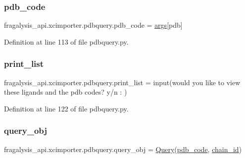 \subsubsection{\texorpdfstring{pdb\+\_\+code}{pdb\_code}}
{\footnotesize\ttfamily fragalysis\+\_\+api.\+xcimporter.\+pdbquery.\+pdb\+\_\+code = \hyperlink{namespacefragalysis__api_1_1xcimporter_1_1pdbquery_aa63ace70140ec79679f3f8be87bb2564}{args}\mbox{[}\textquotesingle{}pdb\textquotesingle{}\mbox{]}}



Definition at line 113 of file pdbquery.\+py.

\mbox{\label{namespacefragalysis__api_1_1xcimporter_1_1pdbquery_a86c375701bbb49fc0670930962e1d2ee}} 
\subsubsection{\texorpdfstring{print\+\_\+list}{print\_list}}
{\footnotesize\ttfamily fragalysis\+\_\+api.\+xcimporter.\+pdbquery.\+print\+\_\+list = input(\textquotesingle{}would you like to view these ligands and the pdb codes? y/n \+: \textquotesingle{})}



Definition at line 122 of file pdbquery.\+py.

\mbox{\label{namespacefragalysis__api_1_1xcimporter_1_1pdbquery_a71559cdf9dc34b17a0a1833931cf988f}} 
\subsubsection{\texorpdfstring{query\+\_\+obj}{query\_obj}}
{\footnotesize\ttfamily fragalysis\+\_\+api.\+xcimporter.\+pdbquery.\+query\+\_\+obj = \hyperlink{classfragalysis__api_1_1xcimporter_1_1pdbquery_1_1_query}{Query}(\hyperlink{namespacefragalysis__api_1_1xcimporter_1_1pdbquery_a05fc5cbce237e976cd5303cd1f1141ad}{pdb\+\_\+code}, \hyperlink{namespacefragalysis__api_1_1xcimporter_1_1pdbquery_a76497bee6f8c2a47827613858ded72d5}{chain\+\_\+id})}



